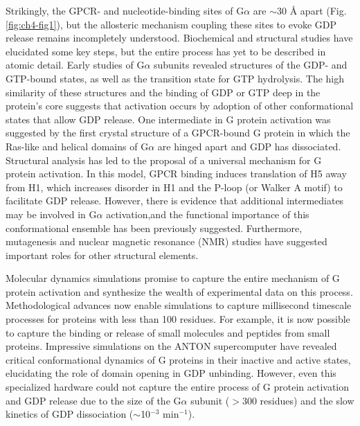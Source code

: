 \documentclass[../main.tex]{subfiles}
\begin{document}
        Strikingly, the GPCR- and nucleotide-binding sites of G$\alpha$ are $\sim$30 \AA{} apart (Fig. \ref{fig:ch4-fig1}), but the allosteric mechanism coupling these sites to evoke GDP release remains incompletely understood\cite{Oldham:2008cr}. Biochemical and structural studies have elucidated some key steps, but the entire process has yet to be described in atomic detail. Early studies of G$\alpha$ subunits revealed structures of the GDP- and GTP-bound states, as well as the transition state for GTP hydrolysis\cite{Sunahara:1997tg,Leipe:2002ky,Westfield:2011ef}. The high similarity of these structures and the binding of GDP or GTP deep in the protein’s core suggests that activation occurs by adoption of other conformational states that allow GDP release\cite{Lambright:1994gd}. One intermediate in G protein activation was suggested by the first crystal structure of a GPCR-bound G protein in which the Ras-like and helical domains of G$\alpha$ are hinged apart and GDP has dissociated\cite{Rasmussen:2011kp}. Structural analysis has led to the proposal of a universal mechanism for G protein activation\cite{Flock:2015dj}. In this model, GPCR binding induces translation of H5 away from H1, which increases disorder in H1 and the P-loop (or Walker A motif\cite{Leipe:2002ky}) to facilitate GDP release. However, there is evidence that additional intermediates may be involved in G$\alpha$ activation\cite{Oldham:2008cr,Westfield:2011ef,Liang:2017cz,Hilger:2018en},and the functional importance of this conformational ensemble has been previously suggested\cite{Furness:2016it}. Furthermore, mutagenesis and nuclear magnetic resonance (NMR) studies have suggested important roles for other structural elements\cite{Toyama:2017gy,Sun:2015gj,Goricanec:2016hl}.

        Molecular dynamics simulations promise to capture the entire mechanism of G protein activation and synthesize the wealth of experimental data on this process. Methodological advances now enable simulations to capture millisecond timescale processes for proteins with less than 100 residues\cite{LindorffLarsen:2011gl}. For example, it is now possible to capture the binding or release of small molecules\cite{Buch:2011bm,Bowman:2012jd,Silva:2011ct,Plattner:2015br,Tiwary:2015hw} and peptides\cite{Plattner:2017fs,Zhou:2017bh} from small proteins. Impressive simulations on the ANTON supercomputer have revealed critical conformational dynamics of G proteins in their inactive and active states, elucidating the role of domain opening in GDP unbinding\cite{Dror:2015bg,Yao:2016kw}. However, even this specialized hardware could not capture the entire process of G protein activation and GDP release due to the size of the G$\alpha$ subunit ($>$300 residues) and the slow kinetics of GDP dissociation ($\sim{}$10$^{-3}$ min$^{-1}$)\cite{Chidiac:1999jh,Ross:2008jm,Mukhopadhyay:1999dp}.
\end{document}
